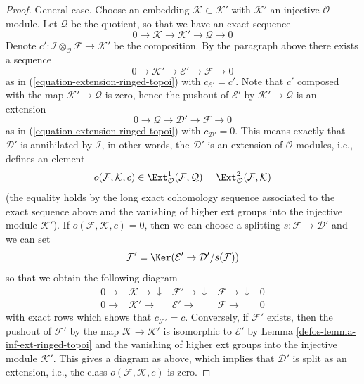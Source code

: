 \begin{proof}
\medskip\noindent
General case. Choose an embedding $\mathcal{K} \subset \mathcal{K}'$
with $\mathcal{K}'$ an injective $\mathcal{O}$-module. Let $\mathcal{Q}$
be the quotient, so that we have an exact sequence
$$
0 \to \mathcal{K} \to \mathcal{K}' \to \mathcal{Q} \to 0
$$
Denote
$c' : \mathcal{I} \otimes_\mathcal{O} \mathcal{F} \to \mathcal{K}'$
be the composition. By the paragraph above there exists a sequence
$$
0 \to \mathcal{K}' \to \mathcal{E}' \to \mathcal{F} \to 0
$$
as in (\ref{equation-extension-ringed-topoi}) with $c_{\mathcal{E}'} = c'$.
Note that $c'$ composed with the map $\mathcal{K}' \to \mathcal{Q}$
is zero, hence the pushout of $\mathcal{E}'$ by
$\mathcal{K}' \to \mathcal{Q}$ is an extension
$$
0 \to \mathcal{Q} \to \mathcal{D}' \to \mathcal{F} \to 0
$$
as in (\ref{equation-extension-ringed-topoi}) with $c_{\mathcal{D}'} = 0$.
This means exactly that $\mathcal{D}'$ is annihilated by
$\mathcal{I}$, in other words, the $\mathcal{D}'$ is an extension
of $\mathcal{O}$-modules, i.e., defines an element
$$
o(\mathcal{F}, \mathcal{K}, c) \in
\Ext^1_\mathcal{O}(\mathcal{F}, \mathcal{Q}) =
\Ext^2_\mathcal{O}(\mathcal{F}, \mathcal{K})
$$
(the equality holds by the long exact cohomology sequence associated
to the exact sequence above and the vanishing of higher ext groups
into the injective module $\mathcal{K}'$). If
$o(\mathcal{F}, \mathcal{K}, c) = 0$, then we can choose a splitting
$s : \mathcal{F} \to \mathcal{D}'$ and we can set
$$
\mathcal{F}' = \Ker(\mathcal{E}' \to \mathcal{D}'/s(\mathcal{F}))
$$
so that we obtain the following diagram
$$
\begin{array}{ccccc}0 \longrightarrow & \mathcal{K} \longrightarrow\downarrow & \mathcal{F}' \longrightarrow\downarrow & \mathcal{F} \longrightarrow\downarrow & 0 \\ 0 \longrightarrow & \mathcal{K}' \longrightarrow & \mathcal{E}' \longrightarrow & \mathcal{F} \longrightarrow & 0\end{array}
$$
with exact rows which shows that $c_{\mathcal{F}'} = c$. Conversely, if
$\mathcal{F}'$ exists, then the pushout of $\mathcal{F}'$ by the map
$\mathcal{K} \to \mathcal{K}'$ is isomorphic to $\mathcal{E}'$ by
Lemma \ref{defos-lemma-inf-ext-ringed-topoi} and the vanishing of higher ext groups
into the injective module $\mathcal{K}'$. This gives a diagram
as above, which implies that $\mathcal{D}'$ is split as an extension, i.e.,
the class $o(\mathcal{F}, \mathcal{K}, c)$ is zero.
\end{proof}

